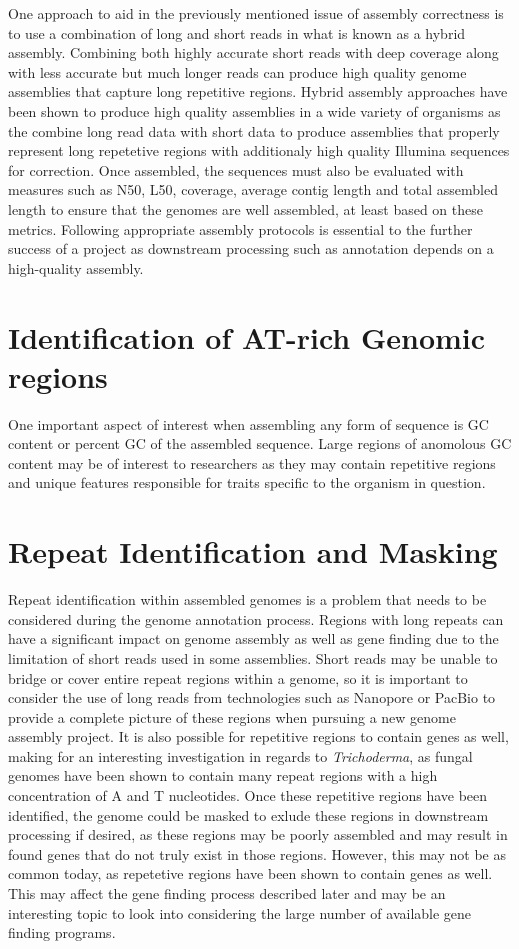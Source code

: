 One approach to aid in the previously mentioned issue of assembly
correctness is to use a combination of long and short reads in what is
known as a hybrid assembly. Combining both highly accurate short reads
with deep coverage along with less accurate but much longer reads can
produce high quality genome assemblies that capture long repetitive
regions. Hybrid assembly approaches have been shown to produce high
quality assemblies in a wide variety of organisms as the combine long
read data with short data to produce assemblies that properly
represent long repetetive regions with additionaly high quality
Illumina sequences for correction. Once assembled, the sequences must
also be evaluated with measures such as N50, L50, coverage, average
contig length and total assembled length to ensure that the genomes
are well assembled, at least based on these
metrics\cite{Nagarajan2013}. Following appropriate assembly protocols
is essential to the further success of a project as downstream
processing such as annotation depends on a high-quality assembly.

\section{Identification of AT-rich Genomic regions}
One important aspect of interest when assembling any form of sequence
is GC content or percent GC of the assembled sequence. Large regions
of anomolous GC content may be of interest to researchers as they may
contain repetitive regions and unique features responsible for traits
specific to the organism in question.

\section{Repeat Identification and Masking}
Repeat identification within assembled genomes is a problem that needs
to be considered during the genome annotation process. Regions with
long repeats can have a significant impact on genome assembly as well
as gene finding due to the limitation of short reads used in some
assemblies\cite{Treangen2011}. Short reads may be unable to bridge or
cover entire repeat regions within a genome, so it is important to
consider the use of long reads from technologies such as Nanopore or
PacBio to provide a complete picture of these regions when pursuing a
new genome assembly project. It is also possible for repetitive
regions to contain genes as well, making for an interesting
investigation in regards to \textit{Trichoderma}, as fungal genomes
have been shown to contain many repeat regions with a high
concentration of A and T
nucleotides\cite{10.1371/journal.pgen.1007467}. Once these repetitive
regions have been identified, the genome could be masked to exlude
these regions in downstream processing if desired, as these regions
may be poorly assembled and may result in found genes that do not
truly exist in those regions. However, this may not be as common
today, as repetetive regions have been shown to contain genes as
well\cite{Slotkin2018}. This may affect the gene finding process
described later and may be an interesting topic to look into
considering the large number of available gene finding programs.

